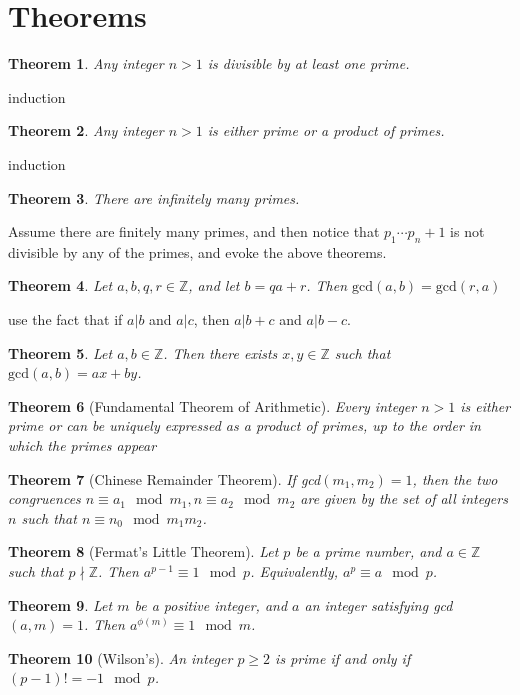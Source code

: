 \documentclass[10pt,letter]{article}
\theoremstyle{plain}
\newtheorem*{theorem*}{Theorem}
\theoremstyle{definition}
\begin{document}
\section{Theorems}
\begin{theorem*}
     Any integer $n>1$ is divisible by at least one prime.
\end{theorem*}
induction
\begin{theorem*}
     Any integer $n>1$ is either prime or a product of primes.
\end{theorem*}
induction
\begin{theorem*}
     There are infinitely many primes.
\end{theorem*}
Assume there are finitely many primes, and then notice that $p_1\cdots p_n+1$ is not divisible by any of the primes, and evoke the above theorems. 
\begin{theorem*}
     Let $a,b,q,r\in\mathbb{Z}$, and let $b=qa+r$. Then $\text{gcd}(a,b)=\text{gcd}(r,a)$
\end{theorem*}
use the fact that if $a|b$ and $a|c$, then $a|b+c$ and $a|b-c$. 
\begin{theorem*}
     Let $a,b\in\mathbb{Z}$. Then there exists $x,y\in\mathbb{Z}$ such that $\text{gcd}(a,b)=ax+by$.
\end{theorem*}
\begin{theorem*}[Fundamental Theorem of Arithmetic]
     Every integer $n>1$ is either prime or can be uniquely expressed as a product of primes, up to the order in which the primes appear
\end{theorem*}
\begin{theorem*}[Chinese Remainder Theorem]
     If gcd$(m_1,m_2)=1$, then the two congruences $n\equiv a_1\mod{m_1},n\equiv a_2\mod{m_2}$ are given by the set of all integers $n$ such that $n\equiv n_0\mod{m_1m_2}$. 
\end{theorem*}
\begin{theorem*}[Fermat's Little Theorem]
     Let $p$ be a prime number, and $a\in\mathbb{Z}$ such that $p\nmid\mathbb{Z}$. Then $a^{p-1}\equiv 1\mod{p}$. Equivalently, $a^p\equiv a\mod{p}$.
\end{theorem*}
\begin{theorem*}
     Let $m$ be a positive integer, and $a$ an integer satisfying gcd$(a,m)=1$. Then $a^{\phi(m)}\equiv 1\mod{m}$. 
\end{theorem*}
\begin{theorem*}[Wilson's]
     An integer $p\geq2$ is prime if and only if $(p-1)!=-1\mod{p}$.
\end{theorem*}
\end{document}
